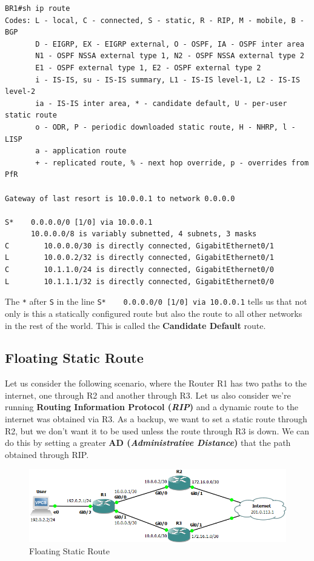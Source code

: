 \vspace{-15pt}
\begin{verbatim}
BR1#sh ip route 
Codes: L - local, C - connected, S - static, R - RIP, M - mobile, B - BGP
       D - EIGRP, EX - EIGRP external, O - OSPF, IA - OSPF inter area 
       N1 - OSPF NSSA external type 1, N2 - OSPF NSSA external type 2
       E1 - OSPF external type 1, E2 - OSPF external type 2
       i - IS-IS, su - IS-IS summary, L1 - IS-IS level-1, L2 - IS-IS level-2
       ia - IS-IS inter area, * - candidate default, U - per-user static route
       o - ODR, P - periodic downloaded static route, H - NHRP, l - LISP
       a - application route
       + - replicated route, % - next hop override, p - overrides from PfR

Gateway of last resort is 10.0.0.1 to network 0.0.0.0

S*    0.0.0.0/0 [1/0] via 10.0.0.1
      10.0.0.0/8 is variably subnetted, 4 subnets, 3 masks
C        10.0.0.0/30 is directly connected, GigabitEthernet0/1
L        10.0.0.2/32 is directly connected, GigabitEthernet0/1
C        10.1.1.0/24 is directly connected, GigabitEthernet0/0
L        10.1.1.1/32 is directly connected, GigabitEthernet0/0
\end{verbatim}
\vspace{-10pt}

\noindent
The \verb|*| after \verb|S| in the line \verb|S*    0.0.0.0/0 [1/0] via 10.0.0.1| tells us that not only is this a statically configured route but also the route to all other networks in the rest of the world. This is called the \textbf{Candidate Default} route. 

\subsection{Floating Static Route}
Let us consider the following scenario, where the Router R1 has two paths to the internet, one through R2 and another through R3. Let us also consider we're running \textbf{Routing Information Protocol (\textit{RIP})} and a dynamic route to the internet was obtained via R3. As a backup, we want to set a static route through R2, but we don't want it to be used unless the route through R3 is down. We can do this by setting a greater \textbf{AD (\textit{Administrative Distance})} that the path obtained through RIP. 

\begin{figure}[H]
\centering
\includegraphics[width=0.9\linewidth]{"ICND1/2. Routers/chapters/3.1.d Floating Static Route"}
\caption{Floating Static Route}
\label{fig:9.1.d}
\end{figure}

